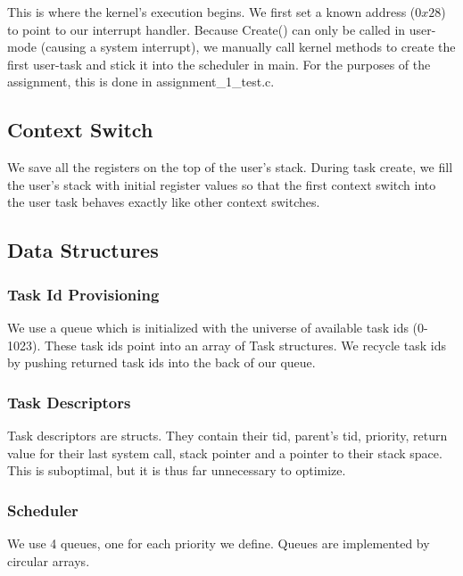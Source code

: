 \documentclass[letterpaper]{article}
\begin{document}
This is where the kernel's execution begins. We first set a known address ($0x28$) to point to our interrupt handler. Because Create() can only be called in user-mode (causing a system interrupt), we manually call kernel methods to create the first user-task and stick it into the scheduler in main. For the purposes of the assignment, this is done in assignment\_1\_test.c.

\subsection{Context Switch}

We save all the registers on the top of the user's stack. During task create, we fill the user's stack with initial
register values so that the first context switch into the user task behaves exactly like other context switches.

\subsection{Data Structures}

\subsubsection{Task Id Provisioning}
We use a queue which is initialized with the universe of available task ids (0-1023). These task ids point into an array
of Task structures. We recycle task ids by pushing returned task ids into the back of our queue.

\subsubsection{Task Descriptors}
Task descriptors are structs. They contain their tid, parent's tid, priority, return value for their last system call, stack pointer and a pointer to their stack space. This is suboptimal, but it is thus far unnecessary to optimize.

\subsubsection{Scheduler}
We use 4 queues, one for each priority we define. Queues are implemented by circular arrays.
\end{document}

